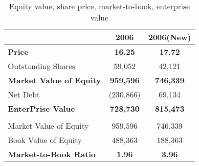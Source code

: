 \begin{table}[ht]
\centering
\begin{tabular}{@{}lcc@{}}
\toprule
                              & 2006             & 2006(New)        \\ \midrule
\textbf{Price}                & \textbf{16.25}   & \textbf{17.72}   \\
Outstanding Shares            & 59,052           & 42,121           \\
\textbf{Market Value of Equity}        & \textbf{959,596}          & \textbf{746,339}          \\
Net Debt                      & (230,866)        & 69,134           \\
\textbf{EnterPrise Value}     & \textbf{728,730} & \textbf{815,473} \\
                              &                  &                  \\
Market Value of Equity        & 959,596          & 746,339          \\
Book Value of Equity          & 488,363          & 188,363          \\
\textbf{Market-to-Book Ratio} & \textbf{1.96}    & \textbf{3.96}    \\ \bottomrule
\end{tabular}
\caption{Equity value, share price, market-to-book, enterprise value}
\label{tab:q4-ev}
\end{table}
